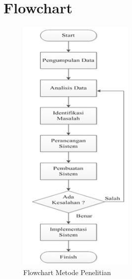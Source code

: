 \documentclass{jtetiproposalskripsi}
\begin{document}
\section{Flowchart}
\begin{figure}[ht!]
  \centering
    \includegraphics[width=0.5\textwidth]{gambar/flow}
    \caption{Flowchart Metode Penelitian}

\end{figure}
\end{document}
